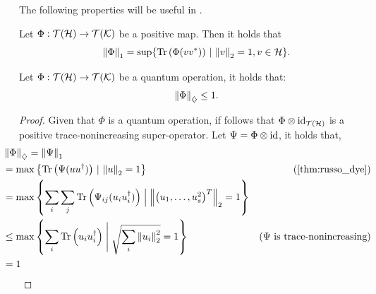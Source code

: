The following properties will be useful in .


\begin{theorem} \label{thm:russo_dye}
Let \(\Phi : \mathcal{T}(\mathcal{H}) \to \mathcal{T}(\mathcal{K})\) be a positive map. Then it holds that
\[
\left\lVert \Phi \right\rVert_{1}= \sup \{ \operatorname{Tr} \left( \Phi(vv^*) \right) \, \vert \, \left\lVert v \right\rVert_{2}=1, v\in \mathcal{H}  \}.
\]
\end{theorem}

\begin{corollary} \label{cor:gen_diamond_cptp_norm}
   Let  $\Phi:  \mathcal{T}(\mathcal{H}) \to \mathcal{T}(\mathcal{K})$ be a quantum operation, it holds that:
    \begin{equation*}
      \left\lVert \Phi \right\rVert_{\diamondsuit} \leq 1.
    \end{equation*}
  \end{corollary}
 

  \begin{proof}
    Given that $\Phi$ is a  quantum operation, if follows that $ \Phi \otimes  \mathrm{id}_{\mathcal{T}(\mathcal{H})}$ is a positive trace-nonincreasing super-operator. Let $\Psi = \Phi \otimes \mathrm{id}$, it holds that,
    \begin{align*}
      & \hspace{-20pt} \diamondnorm{\Phi} =\tracenorm{\Psi}\\
      &  \hspace{-20pt} = \max \left\{\tr \left( \Psi (u u^\dag)\right) \, \vert \, \euclideannorm{u}=1 \right\}  & \left(\text{\autoref{thm:russo_dye}}\right)\\
      & \hspace{-20pt} = \max \left\{ \sum_i \sum_j \tr \left( \Psi_{ij} (u_i u_i^\dag)\right) \Bigm|  \euclideannorm{\begin{pmatrix} u_1, \ldots, u_s^2 \end{pmatrix}^T}=1 \right\} \\
      &  \hspace{-20pt} \leq \max \left\{ \sum_i \tr \left( u_i u_i^\dag \right) \Biggm| \sqrt{\sum_i \euclideannorm{u_i}^2}=1 \right\}   & (\Psi \text{ is trace-nonincreasing}) \\
      &  \hspace{-20pt} = 1
    \end{align*}
  \end{proof}



